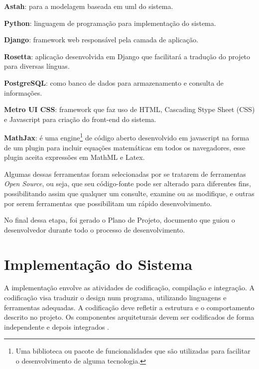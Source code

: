 \begin{alineas}
	\item \textbf{Astah}: para a modelagem baseada em \acrshort{uml} do sistema.
	\item \textbf{Python}: linguagem de programação para implementação do sistema.
    \item \textbf{Django}: framework web responsável pela camada de aplicação.
    \item \textbf{Rosetta}: aplicação desenvolvida em Django que facilitará a tradução do projeto para diversas línguas.  
    \item \textbf{PostgreSQL}: como banco de dados para armazenamento e consulta de informações.
    \item \textbf{Metro UI CSS}: framework que faz uso de HTML, Cascading Stype Sheet (CSS) e Javascript para criação do front-end do sistema.
    \item \textbf{MathJax}: \'e uma engine\footnote{Uma biblioteca ou pacote de funcionalidades que são utilizadas para facilitar o desenvolvimento de alguma tecnologia.} de código aberto 
desenvolvido em 
javascript na forma de um plugin para incluir equações matemáticas em todos os navegadores, esse plugin aceita expressões em  MathML e Latex.

\end{alineas}

Algumas dessas ferramentas foram selecionadas por se tratarem de ferramentas \textit{Open Source}, ou seja, que seu código-fonte pode ser 
alterado para diferentes fins, possibilitando assim que qualquer um consulte, examine ou as modifique, e outras por serem ferramentas que 
possibilitam um rápido desenvolvimento.

No final dessa etapa, foi gerado o Plano de Projeto, documento que guiou o desenvolvedor durante todo o processo de desenvolvimento.

\section{Implementação do Sistema}

A implementação envolve as atividades de codificação, compilação e integração. A codificação visa traduzir o design num programa, utilizando linguagens e  ferramentas adequadas. A codificação 
deve refletir a estrutura e o comportamento descrito no projeto. Os componentes arquiteturais devem ser codificados de forma independente e depois integrados \cite{aguiar2012requisitos}.

